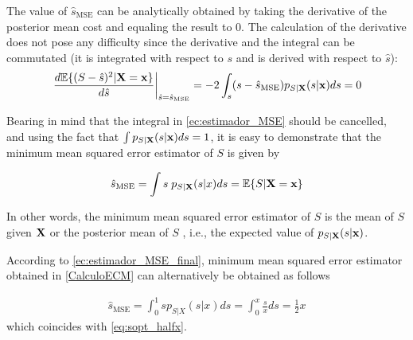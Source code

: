 The value of $\hat s_{\text{MSE}}$ can be analytically obtained by taking the derivative of the posterior mean cost and equaling the result to 0. The calculation of the derivative does not pose any difficulty since the derivative and the integral can be commutated (it is integrated with respect to $s$ and is derived with respect to $\hat s$):
\begin{equation}
\label{ec:estimador_MSE}
\left.\frac{d \mathbb{E}\{(S-\hat s)^2| {\bf X}={\bf x}\}}{d \hat s}\right|_{\hat s = \hat s_{\text{MSE}}} = -2 \int_s (s - \hat s_{\text{MSE}}) p_{S|{\bf X}}(s|{\bf x}) ds = 0
\end{equation}


Bearing in mind that the integral in \eqref{ec:estimador_MSE} should be cancelled, and using the fact that $\int p_{S|{\bf X}}(s|{\bf x}) ds = 1$, it is easy to demonstrate that the minimum mean squared error estimator of $S$ is given by

\begin{framed}
\begin{equation}
\label{ec:estimador_MSE_final}
\hat s_{\text{MSE}} = \int s\;p_{S|{\bf X}}(s|x) ds = \mathbb{E}\{S|{\bf X} ={\bf x}\}
\end{equation}
\end{framed}

In other words, the minimum mean squared error estimator of $S$ is the mean of $S$ given $\bf X$ or the posterior mean of $S$ , i.e., the expected value of $p_{S|{\bf X}}(s|{\bf x})$.



\begin{example}
According to \eqref{ec:estimador_MSE_final}, minimum mean squared error estimator obtained in \ref{CalculoECM} can alternatively be obtained as follows

\begin{align}
\label{ec:estimador_MSE_final2}
\hat s_{\text{MSE}} = \int_0^1 s p_{S|X}(s|x) ds   
   = \int_0^x \frac{s}{x} ds 
   = \frac{1}{2} x
\end{align}
which coincides with \eqref{eq:sopt_halfx}.
\end{example}\vspace{0.4cm}



